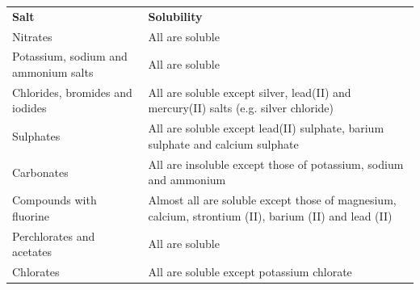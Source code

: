           \begin{table}[H]
        \begin{center}
      \label{m38719*uid69}
    \noindent
      \tablelasttail{}
      \begin{xtabular}[t]{|l|l|}\hline
                \textbf{Salt}
               &
                \textbf{Solubility}
     \tabularnewline{}
        Nitrates &
        All are soluble%
     \tabularnewline{}
        Potassium, sodium and ammonium salts &
        All are soluble%
     \tabularnewline{}
        Chlorides, bromides and iodides &
        All are soluble except silver, lead(II) and mercury(II) salts (e.g. silver chloride)%
     \tabularnewline{}
        Sulphates &
        All are soluble except lead(II) sulphate, barium sulphate and calcium sulphate%
     \tabularnewline{}
        Carbonates &
        All are insoluble except those of potassium, sodium and ammonium%
     \tabularnewline{}
        Compounds with fluorine &
        Almost all are soluble except those of magnesium, calcium, strontium (II), barium (II) and lead (II)%
     \tabularnewline{}
        Perchlorates and acetates &
        All are soluble%
     \tabularnewline{}
        Chlorates &
        All are soluble except potassium chlorate%
     \tabularnewline{}

\end{xtabular}
\end{center}
\end{table}

